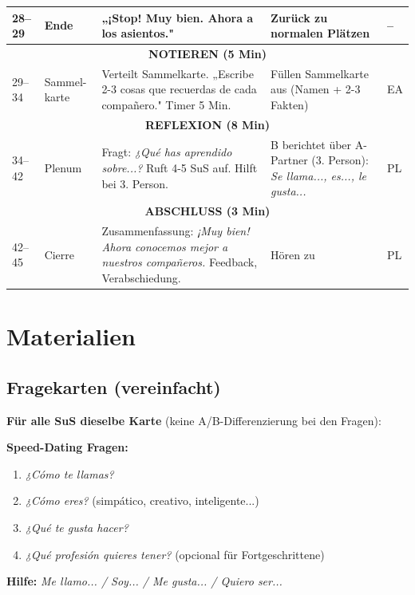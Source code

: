 \documentclass[11pt, a4paper]{article}
\newcommand{\es}[1]{\textcolor{spanisch}{\textit{#1}}}
\begin{document}
\begin{longtable}{|p{1.2cm}|p{2cm}|p{4cm}|p{3.5cm}|p{1.5cm}|}
    28--29 & Ende & „¡Stop! Muy bien. Ahora a los asientos." & Zurück zu normalen Plätzen & -- \\
    \hline

    \multicolumn{5}{|c|}{\cellcolor{hellgrau}\textbf{NOTIEREN (5 Min)}} \\
    \hline

    29--34 & Sammel-karte & Verteilt Sammelkarte. „Escribe 2-3 cosas que recuerdas de cada compañero." Timer 5 Min. & Füllen Sammelkarte aus (Namen + 2-3 Fakten) & EA \\
    \hline

    \multicolumn{5}{|c|}{\cellcolor{hellgrau}\textbf{REFLEXION (8 Min)}} \\
    \hline

    34--42 & Plenum & Fragt: \es{¿Qué has aprendido sobre...?} Ruft 4-5 SuS auf. Hilft bei 3. Person. & B berichtet über A-Partner (3. Person): \es{Se llama..., es..., le gusta...} & PL \\
    \hline

    \multicolumn{5}{|c|}{\cellcolor{hellgrau}\textbf{ABSCHLUSS (3 Min)}} \\
    \hline

    42--45 & Cierre & Zusammenfassung: \es{¡Muy bien! Ahora conocemos mejor a nuestros compañeros.} Feedback, Verabschiedung. & Hören zu & PL \\
    \hline

\end{longtable}


\section{Materialien}

\subsection{Fragekarten (vereinfacht)}

\textbf{Für alle SuS dieselbe Karte} (keine A/B-Differenzierung bei den Fragen):

\begin{infobox}
\textbf{Speed-Dating Fragen:}

\begin{enumerate}
    \item \es{¿Cómo te llamas?}
    \item \es{¿Cómo eres?} (simpático, creativo, inteligente...)
    \item \es{¿Qué te gusta hacer?}
    \item \es{¿Qué profesión quieres tener?} (opcional für Fortgeschrittene)
\end{enumerate}

\textbf{Hilfe:} \es{Me llamo... / Soy... / Me gusta... / Quiero ser...}
\end{infobox}
\end{document}
